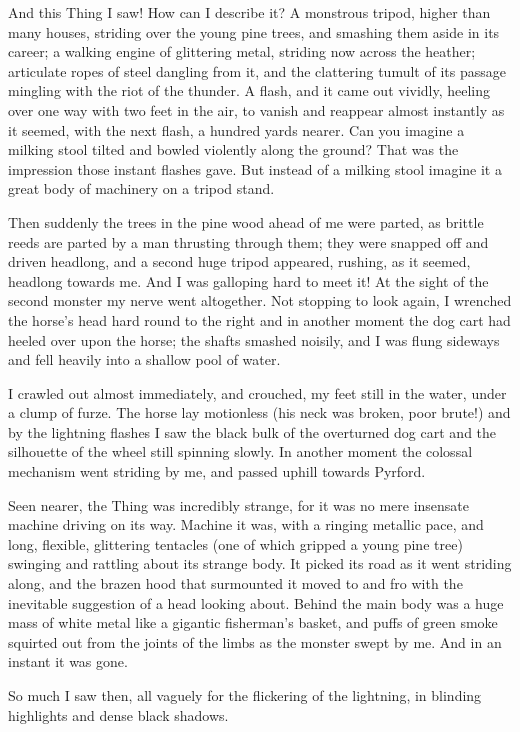 And this Thing I saw! How can I describe it? A monstrous tripod, higher than many houses, striding over the young pine trees, and smashing them aside in its career; a walking engine of glittering metal, striding now across the heather; articulate ropes of steel dangling from it, and the clattering tumult of its passage mingling with the riot of the thunder. A flash, and it came out vividly, heeling over one way with two feet in the air, to vanish and reappear almost instantly as it seemed, with the next flash, a hundred yards nearer. Can you imagine a milking stool tilted and bowled violently along the ground? That was the impression those instant flashes gave. But instead of a milking stool imagine it a great body of machinery on a tripod stand.

Then suddenly the trees in the pine wood ahead of me were parted, as brittle reeds are parted by a man thrusting through them; they were snapped off and driven headlong, and a second huge tripod appeared, rushing, as it seemed, headlong towards me. And I was galloping hard to meet it! At the sight of the second monster my nerve went altogether. Not stopping to look again, I wrenched the horse's head hard round to the right and in another moment the dog cart had heeled over upon the horse; the shafts smashed noisily, and I was flung sideways and fell heavily into a shallow pool of water.

I crawled out almost immediately, and crouched, my feet still in the water, under a clump of furze. The horse lay motionless (his neck was broken, poor brute!) and by the lightning flashes I saw the black bulk of the overturned dog cart and the silhouette of the wheel still spinning slowly. In another moment the colossal mechanism went striding by me, and passed uphill towards Pyrford.

Seen nearer, the Thing was incredibly strange, for it was no mere insensate machine driving on its way. Machine it was, with a ringing metallic pace, and long, flexible, glittering tentacles (one of which gripped a young pine tree) swinging and rattling about its strange body. It picked its road as it went striding along, and the brazen hood that surmounted it moved to and fro with the inevitable suggestion of a head looking about. Behind the main body was a huge mass of white metal like a gigantic fisherman's basket, and puffs of green smoke squirted out from the joints of the limbs as the monster swept by me. And in an instant it was gone.

So much I saw then, all vaguely for the flickering of the lightning, in blinding highlights and dense black shadows.


